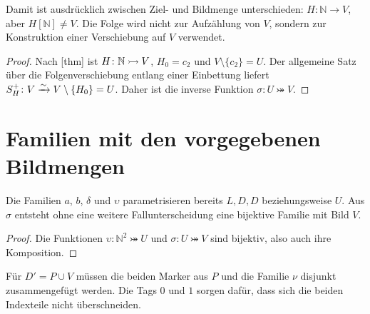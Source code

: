 \documentclass[main.tex]{subfiles}
\begin{document}
Damit ist ausdrücklich zwischen Ziel- und Bildmenge unterschieden:
\(H\colon\mathbb N\to V\), aber \(H[\mathbb N]\neq V\). Die Folge wird
nicht zur Aufzählung von \(V\), sondern zur Konstruktion einer Verschiebung
auf \(V\) verwendet.


\begin{proof}
Nach [thm] ist
\(H\colon\mathbb N\rightarrowtail V\), \(H_0=c_2\) und
\(V\setminus\{c_2\}=U\). Der allgemeine Satz über die Folgenverschiebung
entlang einer Einbettung liefert
\(S^{+}_{H}\colon V\xrightarrow{\sim} V\setminus\{H_0\}=U\). Daher ist die inverse
Funktion \(\sigma\colon U\bij V\).
\end{proof}

\section{Familien mit den vorgegebenen Bildmengen}

Die Familien \(a\), \(b\), \(\delta\) und \(\upsilon\) parametrisieren
bereits \(L,D,D\) beziehungsweise \(U\). Aus \(\sigma\) entsteht ohne eine
weitere Fallunterscheidung eine bijektive Familie mit Bild \(V\).


\begin{proof}
Die Funktionen \(\upsilon\colon\mathbb N^2\bij U\) und
\(\sigma\colon U\bij V\) sind bijektiv, also auch ihre Komposition.
\end{proof}

Für \(D'=P\cup V\) müssen die beiden Marker aus \(P\) und die Familie
\(\nu\) disjunkt zusammengefügt werden. Die Tags \(0\) und \(1\) sorgen
dafür, dass sich die beiden Indexteile nicht überschneiden.
\end{document}
